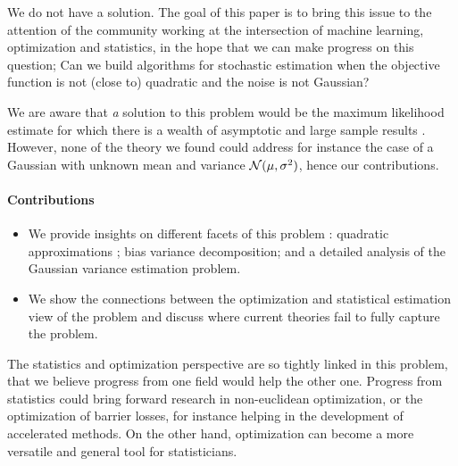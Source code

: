 \documentclass[twoside]{article}
\begin{document}
We do not have a solution. The goal of this paper
is to bring this issue to the attention of the community working at the intersection of machine learning, optimization and statistics,
in the hope that we can make progress on this question;
Can we build algorithms for stochastic estimation
when the objective function is not (close to) quadratic
and the noise is not Gaussian?

We are aware that \emph{a} solution to this problem would be the maximum likelihood estimate for which there is a wealth of asymptotic and large sample results \citep{van2000asymptotic,ostrovskii2021finite}. %
However, none of the theory we found could address for instance the case of a Gaussian with unknown mean and variance ${\mathcal N}(\mu,\sigma^2)$, hence our contributions.

\paragraph{Contributions}
\begin{itemize}
	\item We provide insights on different facets of this problem : quadratic approximations ; bias variance decomposition; and a detailed analysis of the Gaussian variance estimation problem.
	\item We show the connections between the optimization and statistical estimation view of the problem and discuss where current theories fail to fully capture the problem.
\end{itemize}

The statistics and optimization perspective are so tightly linked in this problem, that we believe progress from one field would help the other one.
Progress from statistics could bring forward research in non-euclidean optimization, or the optimization of barrier losses, for instance helping in the development of accelerated methods.
On the other hand, optimization can become  a more versatile and general tool for statisticians. %


\end{document}
